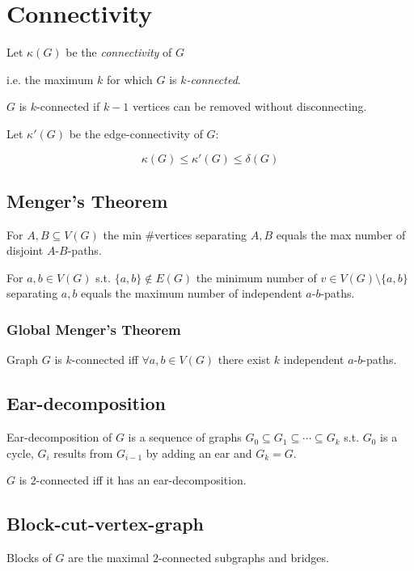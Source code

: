 \section*{Connectivity}

Let $\kappa(G)$ be the \emph{connectivity} of $G$

i.e. the maximum $k$ for which $G$ is \emph{$k$-connected}.

$G$ is $k$-connected if $k-1$ vertices can be removed without disconnecting.

Let $\kappa'(G)$ be the edge-connectivity of $G$:

\vspace*{-3mm}
$$\kappa(G) \leq \kappa'(G) \leq \delta(G)$$

\subsection*{Menger's Theorem}

For $A,B \subseteq V(G)$ the min \#vertices separating $A, B$ equals the max number of disjoint $A$-$B$-paths.

For $a, b \in V(G)$ s.t. $\{a,b\} \notin E(G)$ the minimum number of $v \in V(G)\setminus\{a,b\}$ separating $a, b$ equals the maximum number of independent $a$-$b$-paths.

\subsubsection*{Global Menger's Theorem}

Graph $G$ is $k$-connected iff $\forall a,b \in V(G)$ there exist $k$ independent $a$-$b$-paths.

\subsection*{Ear-decomposition}

Ear-decomposition of $G$ is a sequence of graphs $G_0 \subseteq G_1 \subseteq \cdots \subseteq G_k$ s.t. $G_0$ is a cycle, $G_i$ results from $G_{i-1}$ by adding an ear and $G_k = G$.

$G$ is $2$-connected iff it has an ear-decomposition.

\subsection*{Block-cut-vertex-graph}

Blocks of $G$ are the maximal $2$-connected subgraphs and bridges.

